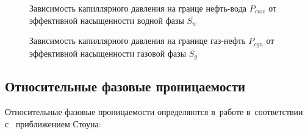 \begin{figure}[h]
\begin{minipage}[h]{0.49\linewidth}
\caption{Зависимость капиллярного давления на граице нефть-вода
$P_{cnw}$ от эффективной насыщенности водной фазы $\overline{S_w}$}
\label{tikz_P_cnw}
\end{minipage}
\hfill
\begin{minipage}[h]{0.49\linewidth}
\caption{Зависимость капиллярного давления на границе газ-нефть 
$P_{cgn}$ от эффективной насыщенности газовой фазы $\overline{S_g}$}
\label{tikz_P_cgn}
\end{minipage}
\end{figure}

\subsection{Относительные фазовые проницаемости}
Относительные фазовые проницаемости определяются в~работе в~соответствии с~
приближением Стоуна\cite{Aziz-Settari}:

